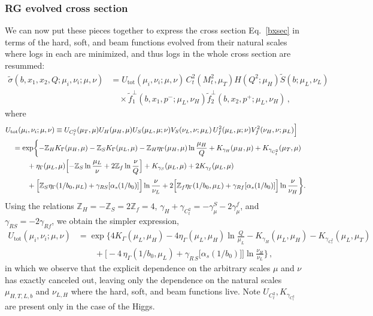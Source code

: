 \documentclass[a4,letterpaper,11pt]{article}
\newcommand{\nn}{\nonumber}
\newcommand{\as}{\alpha_s}
\newcommand{\zed}{\mathbb{Z}}
\newcommand{\wt}{\widetilde}
\newcommand{\eq}[1]{Eq.~\eqref{#1}}
\newcommand{\tft}{\widetilde{f}^\perp}
\begin{document}
\subsubsection{RG evolved cross section}

We can now put these pieces together to express the cross section \eq{bxsec} in terms of the hard, soft, and beam functions evolved from their natural scales where logs in each are minimized, and thus logs in the whole cross section are resummed:
\begin{align} 
\label{sigrun}
\wt\sigma(b,x_1,x_2,Q;\mu_i,\nu_i;\mu,\nu) &=U_{\text{tot}}(\mu_i,\nu_i;\mu,\nu) \, C_t^2(M_t^2, \mu_T) H(Q^2;\mu_H)\wt S(b;\mu_L,\nu_L) \\
&\quad\times \tft_1(b,x_1,p^-;\mu_L,\nu_H) \tft_2(b,x_2,p^+;\mu_L,\nu_H)
\,,\nn 
\end{align}
where
\begin{align}
\label{Utotmunu}
&U_{\text{tot}}(\mu_i,\nu_i;\mu,\nu) \equiv U_{C_t^2}(\mu_T, \mu)U_H(\mu_H, \mu) U_S(\mu_L, \mu; \nu)V_S(\nu_L,\nu;\mu_L)\,U_f^2(\mu_L, \mu; \nu) V_f^2(\nu_H,\nu;\mu_L)\Big]
\nn\\ 
&\quad =
\exp\biggl\{-\zed_H K_\Gamma(\mu_H,\mu) - \zed_S K_\Gamma(\mu_L, \mu) - \zed_H \eta_\Gamma(\mu_H,\mu)\ln\frac{\mu_H}{Q} +K_{\gamma_H}(\mu_H,\mu) + K_{\gamma_{C_t^2}}(\mu_T,\mu)
\nn \\ 
& \qquad\quad +\eta_\Gamma(\mu_L,\mu)\Bigl[-\zed_S \ln\frac{\mu_L}{\nu} + 2\zed_f \ln\frac{\nu}{Q}\Bigr]
+ K_{\gamma_S}(\mu_L,\mu) + 2K_{\gamma_f}(\mu_L,\mu)  \\ 
& \qquad\quad
+ \Bigl[ \zed_S \eta_\Gamma(1/b_0,\mu_L) + \gamma_{RS}[\as(1/b_0)]\Bigr] \ln\frac{\nu}{\nu_L} + 2 \Bigl[ \zed_f \eta_\Gamma(1/b_0,\mu_L) + \gamma_{Rf}[\as(1/b_0)]\Bigr] \ln\frac{\nu}{\nu_H} \biggr\} \nn
. 
\end{align}
Using the relations $\zed_H = -\zed_S = 2\zed_f = 4$, $\gamma_H +\gamma_{C_t^2}= -\gamma_\mu^S - 2\gamma_\mu^f$, and $\gamma_{RS} = -2\gamma_{Rf}$, we obtain the simpler expression,
\begin{align} 
\label{Utot}
U_{\text{tot}}(\mu_i,\nu_i;\mu,\nu) & =
\exp\biggl\{4 K_\Gamma(\mu_L,\mu_H) - 4 \eta_\Gamma(\mu_L,\mu_H) \ln\frac{Q}{\mu_L} - K_{\gamma_H}(\mu_L,\mu_H) - K_{\gamma_{C_t^2}}(\mu_L,\mu_T)
\nn\\ & \qquad
+\Big[ -4\, \eta_\Gamma (1/b_0,\mu_L)+ \gamma_{R\, S}\big[\alpha_s(1/b_0) \big] \Big] \ln \frac{\nu_H}{\nu_L}\biggr\} \,,\end{align}
in which we observe that the explicit dependence on the arbitrary scales $\mu$ and $\nu$ has exactly canceled out, leaving only the dependence on the natural scales $\mu_{H,T,L,b}$ and $\nu_{L,H}$ where the hard, soft, and beam functions live. Note $U_{C_t^2},K_{\gamma_{C_t^2}}$ are present only in the case of the Higgs.
\end{document}
